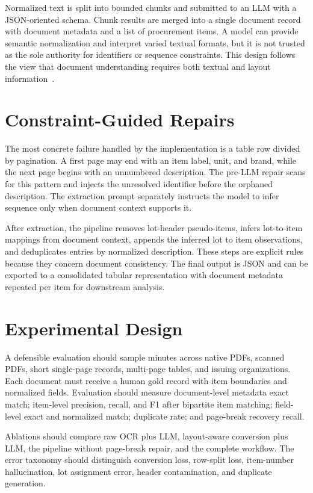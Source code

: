 \documentclass[conference]{IEEEtran}
\begin{document}
Normalized text is split into bounded chunks and submitted to an LLM with a JSON-oriented schema. Chunk results are merged into a single document record with document metadata and a list of procurement items. A model can provide semantic normalization and interpret varied textual formats, but it is not trusted as the sole authority for identifiers or sequence constraints. This design follows the view that document understanding requires both textual and layout information~\cite{xu2020layoutlm, xu2022layoutlmv3}.

\section{Constraint-Guided Repairs}
The most concrete failure handled by the implementation is a table row divided by pagination. A first page may end with an item label, unit, and brand, while the next page begins with an unnumbered description. The pre-LLM repair scans for this pattern and injects the unresolved identifier before the orphaned description. The extraction prompt separately instructs the model to infer sequence only when document context supports it.

After extraction, the pipeline removes lot-header pseudo-items, infers lot-to-item mappings from document context, appends the inferred lot to item observations, and deduplicates entries by normalized description. These steps are explicit rules because they concern document consistency. The final output is JSON and can be exported to a consolidated tabular representation with document metadata repeated per item for downstream analysis.

\section{Experimental Design}
A defensible evaluation should sample minutes across native PDFs, scanned PDFs, short single-page records, multi-page tables, and issuing organizations. Each document must receive a human gold record with item boundaries and normalized fields. Evaluation should measure document-level metadata exact match; item-level precision, recall, and F1 after bipartite item matching; field-level exact and normalized match; duplicate rate; and page-break recovery recall.

Ablations should compare raw OCR plus LLM, layout-aware conversion plus LLM, the pipeline without page-break repair, and the complete workflow. The error taxonomy should distinguish conversion loss, row-split loss, item-number hallucination, lot assignment error, header contamination, and duplicate generation.
\end{document}
